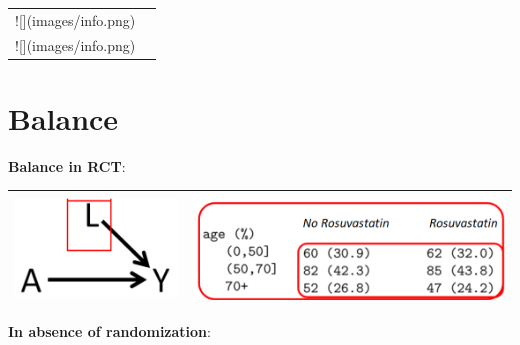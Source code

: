 \documentclass[
]{book}
\begin{document}
\begin{tabular}{l>{}l}
\toprule
![](images/info.png) & \cellcolor[HTML]{3A3B3C}{\textcolor{white}{In a RCT (enough n), the ATT \& ATE are equivalent}}\\
![](images/info.png) & \cellcolor[HTML]{3A3B3C}{\textcolor{white}{In an observational study the ATT and ATE are not necessarily the same.}}\\
\bottomrule
\end{tabular}

\hypertarget{balance}{%
\section{Balance}\label{balance}}

\textbf{Balance in RCT}:

\begin{longtable}[]{@{}ll@{}}
\toprule
\endhead
\includegraphics{images/RCT.png} & \includegraphics{images/balance.png}\tabularnewline
\bottomrule
\end{longtable}

\textbf{In absence of randomization}:
\end{document}
